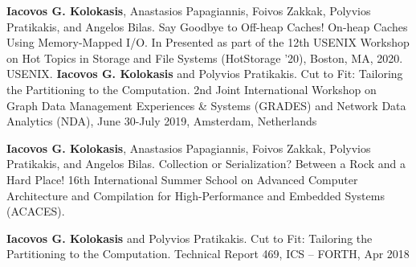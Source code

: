 



\begin{cventries}
\vspace{-15pt}
  \cventry
    {}
    {}
    {}
    {}
    {\textbf{Iacovos G. Kolokasis}, Anastasios Papagiannis, Foivos
    Zakkak, Polyvios Pratikakis, and Angelos Bilas.%
    Say Goodbye to Off-heap Caches! On-heap Caches Using Memory-Mapped
    I/O. In Presented as part of the 12th USENIX Workshop on Hot
    Topics in Storage and File Systems (HotStorage '20), Boston, MA, 2020. USENIX.}
  {}
  \cventry
    {}
    {}
    {}
    {}
    {\textbf{Iacovos G. Kolokasis} and Polyvios
  Pratikakis. Cut to Fit: Tailoring the Partitioning to the
  Computation. 2nd Joint International Workshop on Graph Data
  Management Experiences \& Systems (GRADES) and Network Data
  Analytics (NDA), June 30-July 2019, Amsterdam, Netherlands}
  {}

\end{cventries}


\vspace{-15pt}
\begin{cventries}

  \cventry
    {}
    {}
    {}
    {}
    {\textbf{Iacovos G. Kolokasis}, Anastasios Papagiannis, Foivos
    Zakkak, Polyvios Pratikakis, and Angelos Bilas.%
    Collection or Serialization? Between a Rock and a Hard Place! 
    16th International Summer School on Advanced Computer Architecture
    and Compilation for High-Performance and Embedded Systems
    (ACACES).}
  {}

\end{cventries}
      

\vspace{-15pt}
\begin{cventries}

  \cventry
    {}
    {}
    {}
    {}
    {\textbf{Iacovos G. Kolokasis} and Polyvios Pratikakis.
      Cut to Fit: Tailoring the Partitioning to the Computation.
      Technical Report 469, ICS -- FORTH, Apr 2018 }{}%


\end{cventries}
